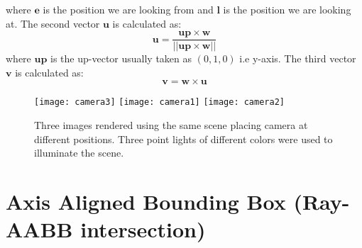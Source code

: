 \documentclass[11pt,a4paper]{article}
\begin{document}
	\noindent
	where $\boldsymbol{e}$ is the position we are looking from and $\boldsymbol{l}$ is the position we are looking at. The second vector $\boldsymbol{u}$ is calculated as:
	\begin{equation}
		\boldsymbol{u} = \frac{\boldsymbol{up} \times \boldsymbol{w}}{||\boldsymbol{up} \times \boldsymbol{w}||}
	\end{equation}
	where $\boldsymbol{up}$ is the up-vector usually taken as $(0, 1, 0)$ i.e y-axis. The third vector $\boldsymbol{v}$ is calculated as:
	\begin{equation}
		\boldsymbol{v} = \boldsymbol{w} \times \boldsymbol{u}
	\end{equation}
	\begin{figure}[H]
		\centering
		\captionsetup{justification=centering}
		\texttt{[image: camera3]}\quad
		\texttt{[image: camera1]}\quad
		\texttt{[image: camera2]}\quad
		\caption{Three images rendered using the same scene placing camera at different positions. Three point lights of different colors were used to illuminate the scene.}
	\end{figure}
	
	\section{Axis Aligned Bounding Box (Ray-AABB intersection)}
	
\end{document}
